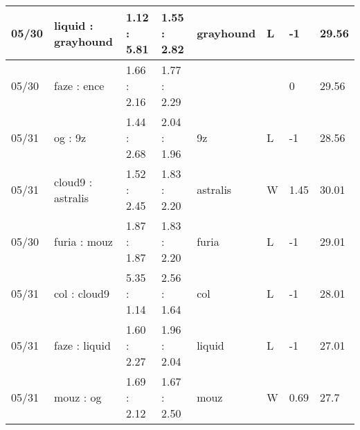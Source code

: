 \begin{small}
\begin{longtable}{|l|l|l|l|l|l|l|l|}
	05/30                               & liquid : grayhound                  & 1.12 : 5.81                             & 1.55 : 2.82                             & grayhound                         & L                                 & -1                                   & 29.56                             \\ \hline
	05/30                               & faze : ence                         & 1.66 : 2.16                             & 1.77 : 2.29                             &                                   &                                   & 0                                    & 29.56                             \\ \hline
	05/31                               & og : 9z                             & 1.44 : 2.68                             & 2.04 : 1.96                             & 9z                                & L                                 & -1                                   & 28.56                             \\ \hline
	05/31                               & cloud9 : astralis                   & 1.52 : 2.45                             & 1.83 : 2.20                             & astralis                          & W                                 & 1.45                                 & 30.01                             \\ \hline
	05/30                               & furia : mouz                        & 1.87 : 1.87                             & 1.83 : 2.20                             & furia                             & L                                 & -1                                   & 29.01                             \\ \hline
	05/31                               & col : cloud9                        & 5.35 : 1.14                             & 2.56 : 1.64                             & col                               & L                                 & -1                                   & 28.01                             \\ \hline
	05/31                               & faze : liquid                       & 1.60 : 2.27                             & 1.96 : 2.04                             & liquid                            & L                                 & -1                                   & 27.01                             \\ \hline
	05/31                               & mouz : og                           & 1.69 : 2.12                             & 1.67 : 2.50                             & mouz                              & W                                 & 0.69                                 & 27.7                              \\ \hline

\end{longtable}
\end{small}
